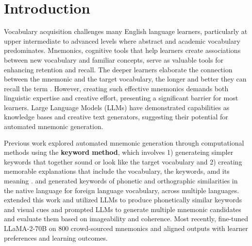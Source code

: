 \documentclass[11pt]{article}
\begin{document}
\section{Introduction}
Vocabulary acquisition challenges many English language learners, particularly at upper intermediate to advanced levels where abstract and academic vocabulary predominates. Mnemonics, cognitive tools that help learners create associations between new vocabulary and familiar concepts, serve as valuable tools for enhancing retention and recall. The deeper learners elaborate the connection between the mnemonic and the target vocabulary, the longer and better they can recall the term \citealp{}. However, creating such effective mnemonics demands both linguistic expertise and creative effort, presenting a significant barrier for most learners. Large Language Models (LLMs) have demonstrated capabilities as knowledge bases and creative text generators, suggesting their potential for automated mnemonic generation.

Previous work explored automated mnemonic generation through computational methods using the \textbf{keyword method}, which involves 1) generateing simpler keywords that together sound or look like the target vocabulary and 2) creating memorable explanations that include the vocabulary, the keywords, amd its meaning \citep{atkinsonApplicationMnemonicKeyword1975}. \citet{savvaTransPhonerAutomatedMnemonic2014} and \citet{OzbalAUTOMATION2014} generated keywords of phonetic and orthographic similarities in the native language for foreign language vocabulary, across multiple languages. \citet{LeeSMARTPHONE2023} extended this work and utilized LLMs to produce phonetically similar keywords and visual cues and \citet{LeeEXPLORING2024} prompted LLMs to generate multiple mnemonic candidates and evaluate them based on imageability and coherence. Most recently, \citet{balepurSMART2024} fine-tuned LLaMA-2-70B on 800 crowd-sourced mnemonics and aligned outputs with learner preferences and learning outcomes.

\end{document}
